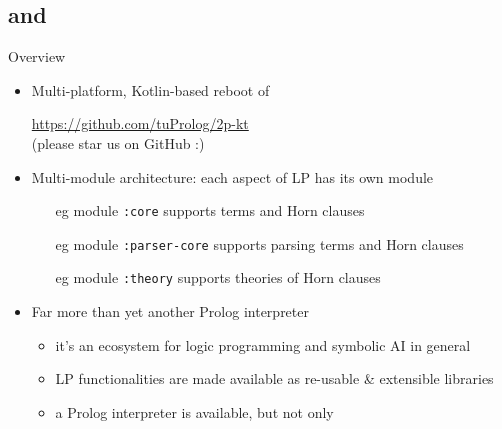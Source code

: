 \documentclass[presentation]{beamer}\mode<presentation>{\usetheme{AMSBolognaFC}}
\begin{document}
\subsection{\tuprolog{} and \twopkt{}}

\begin{frame}{\twopkt{} Overview}
\label{slide:tuprolog-overview}
    \begin{itemize}
        \item Multi-platform, Kotlin-based reboot of \tuprolog{}
        \begin{center}
            \alert{\url{https://github.com/tuProlog/2p-kt}}
            \\
            \small(please star us on GitHub :)
        \end{center}

        \vfill

        \item Multi-module architecture: each aspect of LP has its own module
        \begin{itemize}
            \item[eg] module \texttt{:core} supports \alert{terms and Horn clauses}
            \item[eg] module \texttt{:parser-core} supports \alert{parsing} terms and Horn clauses
            \item[eg] module \texttt{:theory} supports \alert{theories} of Horn clauses
        \end{itemize}

        \vfill

        \item Far more than yet another Prolog interpreter
        \begin{itemize}
            \item it's an \alert{ecosystem} for logic programming and symbolic AI in general
            \item LP functionalities are made available as re-usable \& extensible \alert{libraries}
            \item a Prolog interpreter is available, but not only
        \end{itemize}

    \end{itemize}
\end{frame}
\end{document}

